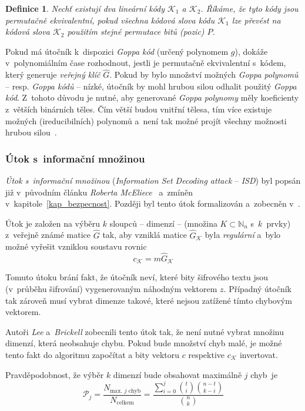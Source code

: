 \documentclass[thesis=M,czech,hidelinks]{FITthesis}[2012/06/26]
\newcommand{\0}{{\textcolor[gray]{0.75}{0}}}
\newtheorem{definice}{Definice}
\begin{document}
\begin{definice}
    Nechť existují dva lineární kódy $\mathcal{K}_1$ a $\mathcal{K}_2$. Říkáme,
    že tyto kódy jsou \emph{permutačně ekvivalentní}, pokud všechna kódová slova
    kódu $\mathcal{K}_1$ lze převést na kódová slova $\mathcal{K}_2$ použitím
    stejné permutace bitů (pozic) $P$.
\end{definice}

Pokud má útočník k~dispozici \emph{Goppa kód} (určený polynomem $g$), dokáže
v~polynomiálním čase rozhodnout, jestli je permutačně ekvivalentní s~kódem,
který generuje \emph{veřejný klíč} $\hat{G}$. Pokud by bylo množství možných
\emph{Goppa polynomů} -- resp. \emph{Goppa kódů} -- nízké, útočník by mohl
hrubou silou odhalit použitý \emph{Goppa kód}. Z~tohoto důvodu je nutné, aby
generované \emph{Goppa polynomy} měly koeficienty z~větších binárních těles. Čím
větší budou vnitřní tělesa, tím více existuje možných (ireducibilních) polynomů
a~není tak možné projít všechny možnosti hrubou silou~\cite{Repka}.


\subsubsection{Útok s~informační množinou}

\emph{Útok s~informační množinou} (\emph{Information Set Decoding attack} --
\emph{ISD}) byl popsán již v~původním článku \emph{Roberta
McEliece}~\cite{McEliece} a~zmíněn v~kapitole~\ref{kap_bezpecnost}. Později byl
tento útok formalizován a~zobecněn v~\cite{Lee}.

Útok je založen na výběru $k$ sloupců -- dimenzí -- (množina
$K\subset\mathbb{N}_n$ s~$k$~prvky) z~veřejně známé matice $\hat{G}$ tak, aby
vzniklá matice $\hat{G}_{\mathcal{K}}$ byla \emph{regulární} a~bylo možné
vyřešit vzniklou soustavu rovnic
$$ c_{\mathcal{K}} = m \hat{G}_{\mathcal{K}} $$

Tomuto útoku brání fakt, že útočník neví, které bity šifrového textu jsou
(v~průběhu šifrování)  vygenerovaným náhodným vektorem $z$.
Případný útočník tak zároveň musí vybrat dimenze takové, které nejsou zatížené
tímto chybovým vektorem.

Autoři \emph{Lee} a~\emph{Brickell} zobecnili tento útok tak, že není nutné
vybrat množinu dimenzí, která neobsahuje chybu. Pokud bude množství chyb malé,
je možné tento fakt do algoritmu započítat a bity vektoru $c$ respektive
$c_{\mathcal{K}}$ invertovat.

Pravděpodobnost, že výběr $k$ dimenzí bude obsahovat maximálně $j$ chyb~je
$$
    \mathcal{P}_j= \frac{N_{\text{max. $j$ chyb}}}{N_{\text{celkem}}}
    = \frac{\sum_{i=0}^{j}\binom{t}{i}\binom{n-t}{k-i}}{\binom{n}{k}}
$$
\end{document}
